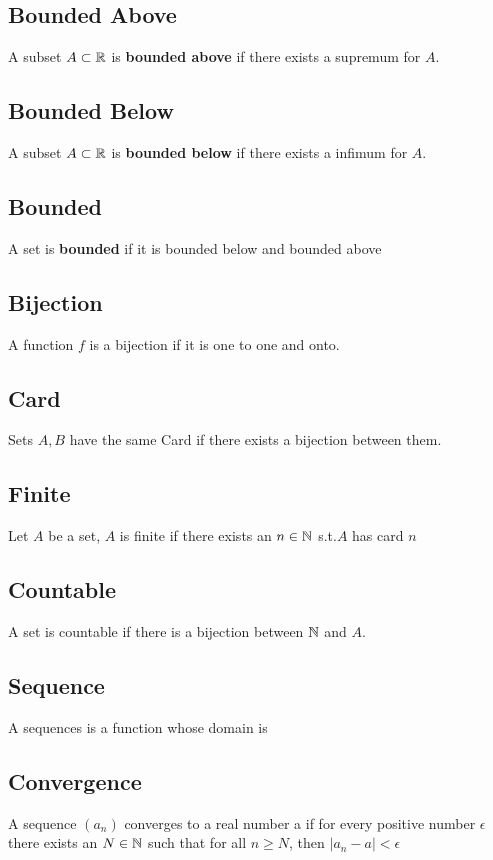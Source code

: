 \documentclass{article}
\begin{document}
\subsection{Bounded Above}
A subset $A \subset \protect\mathbb{R}$ is \textbf{bounded above} if there exists a supremum for $A$.
\subsection{Bounded Below}
A subset $A \subset \protect\mathbb{R}$ is \textbf{bounded below} if there exists a infimum for $A$.

\subsection{Bounded}
A set is \textbf{bounded} if it is bounded below and bounded above

\subsection{Bijection}
A function $f$ is a bijection if it is one to one and onto.

\subsection{Card}
Sets $A,B$ have the same Card if there exists a bijection between them.

\subsection{Finite}
Let $A$ be a set, $A$ is finite if there exists an $n \in \protect\mathbb{N}$ s.t.$A$ has card $n$

\subsection{Countable}
A set is countable if there is a bijection between $\protect\mathbb{N}$ and $A$.

\subsection{Sequence}
A sequences is a function whose domain is \bN

\subsection{Convergence}
A sequence $(a_n)$ converges to a real number a if for every positive number $\epsilon$ there exists an $N \in \protect\mathbb{N}$ such that for all $n \ge N$, then $|a_n - a| < \epsilon$
\end{document}
